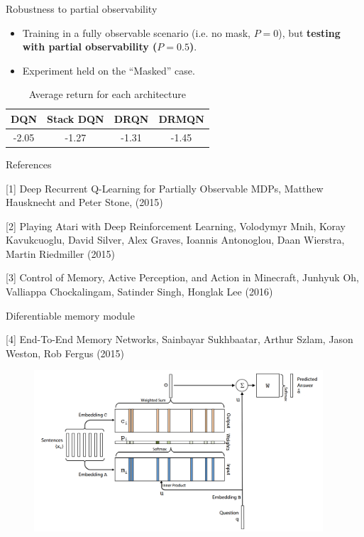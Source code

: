 \documentclass{beamer}
\begin{document}
\begin{frame}{Robustness to partial observability}
	
	\begin{itemize}
		\item Training in a fully observable scenario (i.e. no mask, $P=0$), but \textbf{testing with partial observability ($P=0.5$)}.
		\item Experiment held on the ``Masked'' case.
	\end{itemize}
	
	\begin{table}[]
		\centering
		\caption{Average return for each architecture}
		\label{my-label}
		\begin{tabular}{|c|c|c|c|}
			\hline
			DQN & Stack DQN & DRQN        & DRMQN       \\ \hline
			-2.05  & -1.27  & -1.31 & -1.45 \\ \hline
		\end{tabular}
	\end{table}
	
\end{frame}

\begin{frame}{References}
	
	[1] Deep Recurrent Q-Learning for Partially Observable MDPs, Matthew Hausknecht and Peter Stone, (2015) \vspace{0.3cm}
	
	[2] Playing Atari with Deep Reinforcement Learning, Volodymyr Mnih, Koray Kavukcuoglu, David Silver, Alex Graves, Ioannis Antonoglou, Daan Wierstra, Martin Riedmiller (2015) \vspace{0.3cm}
	
	[3] Control of Memory, Active Perception, and Action in Minecraft, Junhyuk Oh, Valliappa Chockalingam, Satinder Singh, Honglak Lee (2016)
	
\end{frame}


\begin{frame}{Diferentiable memory module}
	
	[4] End-To-End Memory Networks, Sainbayar Sukhbaatar, Arthur Szlam, Jason Weston, Rob Fergus (2015)
	
	\begin{figure}
		\includegraphics[height=6cm]{imgs/memory_module.png}
	\end{figure}
	
\end{frame}
\end{document}
